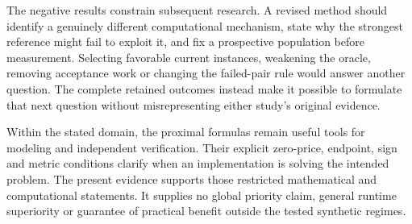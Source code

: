 The negative results constrain subsequent research. A revised
method should identify a genuinely different computational
mechanism, state why the strongest reference might fail to
exploit it, and fix a prospective population before measurement.
Selecting favorable current instances, weakening the oracle,
removing acceptance work or changing the failed-pair rule would
answer another question. The complete retained outcomes instead
make it possible to formulate that next question without
misrepresenting either study's original evidence.

Within the stated domain, the proximal formulas remain useful
tools for modeling and independent verification. Their explicit
zero-price, endpoint, sign and metric conditions clarify when
an implementation is solving the intended problem. The present
evidence supports those restricted mathematical and computational
statements. It supplies no global priority claim, general runtime
superiority or guarantee of practical benefit outside the tested
synthetic regimes.
